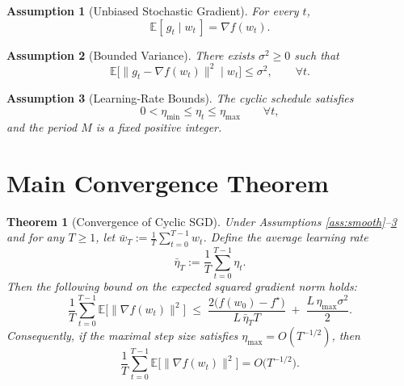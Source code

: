 \documentclass{article}
\newtheorem{theorem}{Theorem}
\newtheorem{assumption}{Assumption}
\begin{document}
\begin{assumption}[Unbiased Stochastic Gradient]\label{ass:unbiased}
For every $t$,
\[
\mathbb{E}[\,g_{t}\mid w_{t}\,]=\nabla f(w_{t}). 
\tag{A2}
\]
\end{assumption}

\begin{assumption}[Bounded Variance]\label{ass:variance}
There exists $\sigma^{2}\ge0$ such that
\[
\mathbb{E}\bigl[\|g_{t}-\nabla f(w_{t})\|^{2}\mid w_{t}\bigr]\le\sigma^{2},
\qquad\forall t.
\tag{A3}
\]
\end{assumption}

\begin{assumption}[Learning‑Rate Bounds]\label{ass:eta}
The cyclic schedule satisfies
\[
0<\eta_{\min}\le\eta_{t}\le\eta_{\max}\qquad\forall t,
\]
and the period $M$ is a fixed positive integer.
\end{assumption}

\section*{Main Convergence Theorem}
\begin{theorem}[Convergence of Cyclic SGD]\label{thm:main}
Under Assumptions \ref{ass:smooth}–\ref{ass:eta} and for any
$T\ge 1$, let $\bar w_{T}:=\frac{1}{T}\sum_{t=0}^{T-1}w_{t}$.
Define the average learning rate
\[
\bar\eta_{T}:=\frac{1}{T}\sum_{t=0}^{T-1}\eta_{t}.
\]
Then the following bound on the expected squared gradient norm holds:
\[
\frac{1}{T}\sum_{t=0}^{T-1}\mathbb{E}\!\bigl[\|\nabla f(w_{t})\|^{2}\bigr]
\;\le\;
\frac{2\bigl(f(w_{0})-f^{\star}\bigr)}{L\,\bar\eta_{T}T}
\;+\;
\frac{L\,\eta_{\max}\sigma^{2}}{2}.
\tag{3}
\]
Consequently, if the maximal step size satisfies
$\eta_{\max}=O(T^{-1/2})$, then
\[
\frac{1}{T}\sum_{t=0}^{T-1}\mathbb{E}\!\bigl[\|\nabla f(w_{t})\|^{2}\bigr]
=O\!\bigl(T^{-1/2}\bigr).
\]
\end{theorem}
\end{document}
